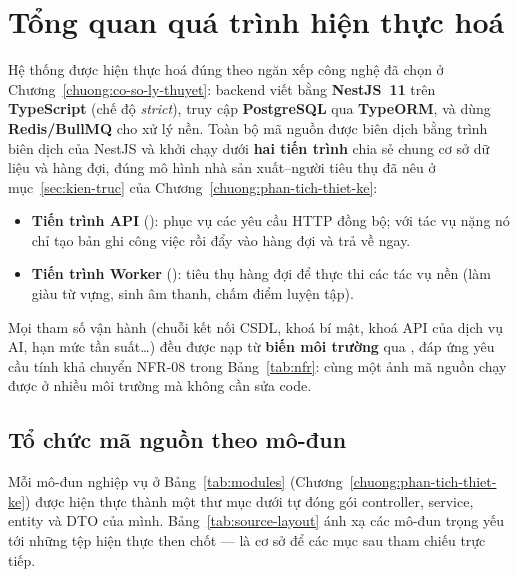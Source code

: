 \section{Tổng quan quá trình hiện thực hoá}
\label{sec:tong-quan-hien-thuc}

Hệ thống được hiện thực hoá đúng theo ngăn xếp công nghệ đã chọn ở
Chương~\ref{chuong:co-so-ly-thuyet}: backend viết bằng \textbf{NestJS~11}
trên \textbf{TypeScript} (chế độ \textit{strict}), truy cập
\textbf{PostgreSQL} qua \textbf{TypeORM}, và dùng \textbf{Redis/BullMQ} cho
xử lý nền. Toàn bộ mã nguồn được biên dịch bằng trình biên dịch của NestJS và
khởi chạy dưới \textbf{hai tiến trình} chia sẻ chung cơ sở dữ liệu và hàng
đợi, đúng mô hình nhà sản xuất--người tiêu thụ đã nêu ở
mục~\ref{sec:kien-truc} của Chương~\ref{chuong:phan-tich-thiet-ke}:

\begin{itemize}
  \item \textbf{Tiến trình API} (): phục vụ các yêu cầu
        HTTP đồng bộ; với tác vụ nặng nó chỉ tạo bản ghi công việc rồi đẩy
        vào hàng đợi và trả về ngay.
  \item \textbf{Tiến trình Worker} (): tiêu thụ
        hàng đợi để thực thi các tác vụ nền (làm giàu từ vựng, sinh âm thanh,
        chấm điểm luyện tập).
\end{itemize}

Mọi tham số vận hành (chuỗi kết nối CSDL, khoá bí mật, khoá API của dịch vụ
AI, hạn mức tần suất\ldots) đều được nạp từ \textbf{biến môi trường} qua
, đáp ứng yêu cầu tính khả chuyển NFR-08 trong
Bảng~\ref{tab:nfr}: cùng một ảnh mã nguồn chạy được ở nhiều môi trường mà
không cần sửa code.

\subsection{Tổ chức mã nguồn theo mô-đun}
\label{subsec:to-chuc-ma-nguon}

Mỗi mô-đun nghiệp vụ ở Bảng~\ref{tab:modules} (Chương~\ref{chuong:phan-tich-thiet-ke})
được hiện thực thành một thư mục dưới  tự đóng gói controller,
service, entity và DTO của mình. Bảng~\ref{tab:source-layout} ánh xạ các
mô-đun trọng yếu tới những tệp hiện thực then chốt --- là cơ sở để các mục
sau tham chiếu trực tiếp.

